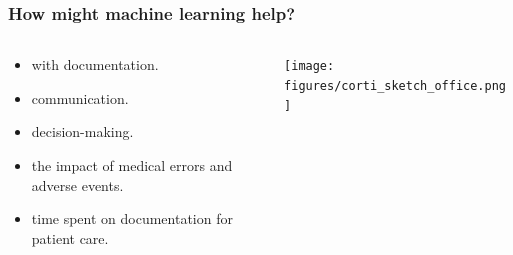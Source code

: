\begin{frame}
    \frametitle{How might machine learning help?}
    \begin{columns}
        \begin{column}{0.35\textwidth}
            \begin{itemize}
                \item <1->  with documentation.
                \item <1->  communication.
                \item <1->  decision-making.
                \vspace{1em}
                \item <2->  the impact of medical errors and adverse events.
                \item <2->  time spent on documentation for patient care.
            \end{itemize}
        \end{column}
        \begin{column}{0.65\textwidth}
            \centering
            \texttt{[image: figures/corti\_sketch\_office.png]}
        \end{column}
    \end{columns}

\end{frame}



